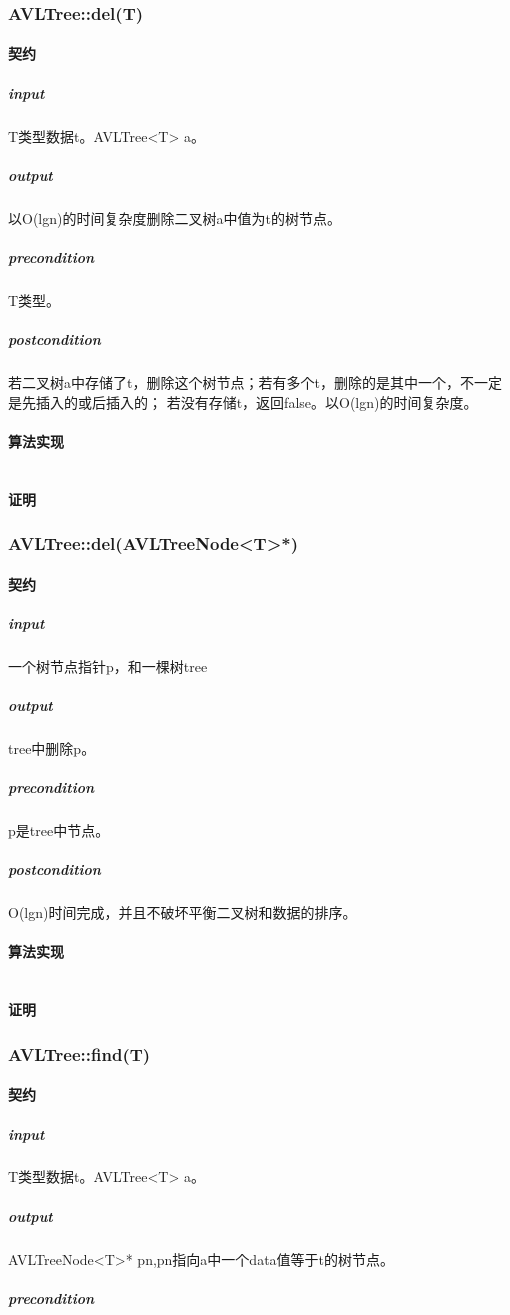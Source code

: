 \documentclass[a4paper]{book}
\numberwithin{equation}{chapter}
\theoremstyle{definition}
\begin{document}
\subsubsection{AVLTree::del(T)}
\paragraph{契约}
\subparagraph{input}
T类型数据t。AVLTree<T> a。
\subparagraph{output}
以O(lgn)的时间复杂度删除二叉树a中值为t的树节点。
\subparagraph{precondition}
T类型。
\subparagraph{postcondition}
若二叉树a中存储了t，删除这个树节点；若有多个t，删除的是其中一个，不一定是先插入的或后插入的；
若没有存储t，返回false。以O(lgn)的时间复杂度。
\paragraph{算法实现}
\begin{lstlisting}
\end{lstlisting}
\paragraph{证明}
\subsubsection{AVLTree::del(AVLTreeNode<T>*)}
\paragraph{契约}
\subparagraph{input}
一个树节点指针p，和一棵树tree
\subparagraph{output}
tree中删除p。
\subparagraph{precondition}
p是tree中节点。
\subparagraph{postcondition}
O(lgn)时间完成，并且不破坏平衡二叉树和数据的排序。
\paragraph{算法实现}
\begin{lstlisting}

\end{lstlisting}
\paragraph{证明}
\subsubsection{AVLTree::find(T)}
\paragraph{契约}
\subparagraph{input}
T类型数据t。AVLTree<T> a。
\subparagraph{output}
AVLTreeNode<T>* pn,pn指向a中一个data值等于t的树节点。
\subparagraph{precondition}
\end{document}
